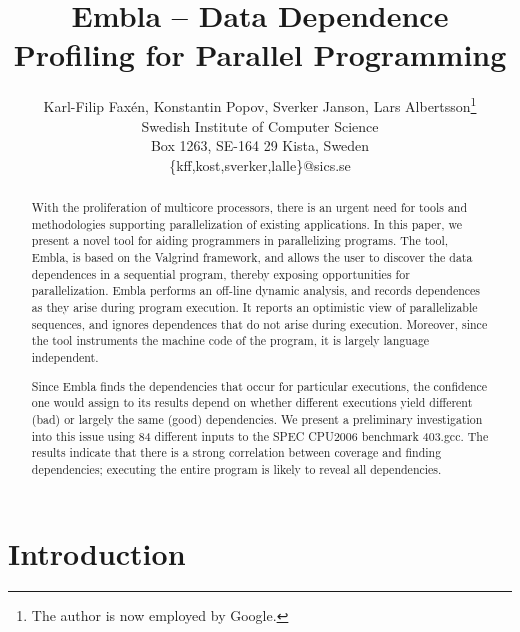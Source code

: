 \documentclass[times, 10pt,twocolumn]{article}
\begin{document}
\title{Embla -- Data Dependence Profiling for Parallel Programming }
\author{Karl-Filip Fax\'en, Konstantin Popov, Sverker Janson, 
       Lars Albertsson\thanks{The author is now employed by Google.}\\
       Swedish Institute of Computer Science\\
       Box 1263, SE-164 29 Kista, Sweden\\
       \{kff,kost,sverker,lalle\}@sics.se}
\date{}
\maketitle

\begin{abstract}

With the proliferation of multicore processors, there is an urgent need for
tools and methodologies supporting parallelization of existing
applications.  In this paper, we present a novel tool for aiding
programmers in parallelizing programs. The tool, Embla, is based on the
Valgrind framework, and allows the user to
discover the data dependences in a sequential program, thereby exposing
opportunities for parallelization.  Embla performs an off-line dynamic 
analysis, and records dependences as they
arise during program execution.  It reports an optimistic view of
parallelizable sequences, and ignores dependences that do not arise during
execution.  
Moreover, since the tool instruments the machine code of the program,
it is largely language independent. 

Since Embla finds the dependencies that occur for particular
executions, the confidence one would assign to its results depend on
whether different executions yield different (bad) or largely the same
(good) dependencies. We present a preliminary investigation into this
issue using 84 different inputs to the SPEC CPU2006 benchmark 403.gcc.
The results indicate that there is a strong correlation between coverage
and finding dependencies; executing the entire program is likely to 
reveal all dependencies.
\end{abstract}


\section{Introduction}
\end{document}
